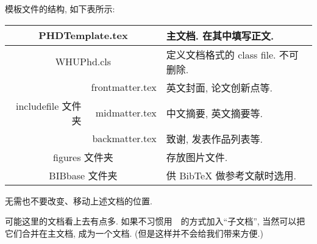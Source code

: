 \documentclass{WHUPhd}  %
\begin{document}
模板文件的结构, 如下表所示:
 \begin{table}[ht]\centering
\begin{tabular}{r|r|l}
\hline\hline
  \multicolumn{2}{c|}{PHDTemplate.tex }  &  主文档. 在其中填写正文.\\\hline
  \multicolumn{2}{c|}{WHUPhd.cls} &  定义文档格式的 class file. 不可删除.\\\hline
                          &frontmatter.tex&  英文封面, 论文创新点等. \\\cline{2-3}
 includefile 文件夹  & midmatter.tex  &  中文摘要, 英文摘要等.  \\\cline{2-3}
                            & backmatter.tex &  致谢, 发表作品列表等.  \\\hline
  \multicolumn{2}{c|}{figures 文件夹} &  存放图片文件.\\\hline
  \multicolumn{2}{c|}{BIBbase 文件夹} &   供 BibTeX{} 做参考文献时选用.\\
\hline\hline
\end{tabular}
\end{table}

无需也不要改变、移动上述文档的位置.

可能这里的文档看上去有点多. 如果不习惯用~\verb||~的方式加入``子文档'', 当然可以把它们合并在主文档, 成为一个文档.
({\kaishu 但是这样并不会给我们带来方便.})

\end{document}
